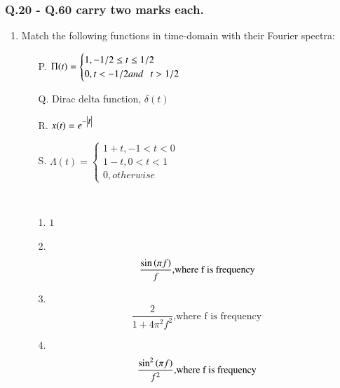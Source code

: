 \documentclass[12pt,fleqn]{article}
\theoremstyle{remark}
\begin{document}
\subsubsection*{Q.20 - Q.60 carry two marks each.}
\begin{enumerate}[label=Q.\arabic*.,font=\bfseries, start = 21]
\item Match the following functions in time-domain with their Fourier spectra: \hfill{} 
\begin{multicols}{2}
    \begin{itemize}
    \item [P.]  $\Pi{(t)} =
        \begin{cases}
        1,-1/2\leq t \leq 1/2\\
        0,t<-1/2and\hspace{.25cm}t>1/2
        \end{cases}  $    
    \item [Q.] Dirac delta function, $\delta(t)$
    \item [R.] $x(t) = e^{-\begin{vmatrix}t\end{vmatrix}}$
    \item [S.] $\Lambda{(t)} =
        \begin{cases}
        1+t,-1<t<0\\
        1-t,0<t<1\\
        0,otherwise
    \end{cases}  $
\end{itemize}
            

            \columnbreak
            
            \\ \begin{itemize}           
            \item [1.] $1$ 
            \item [2.] \[ \frac{\sin{\ensuremath{\left(\pi f\right)}}}{f} \text{,where f is frequency }\]
            \item [3.] $$ \frac{2}{1+4\pi^2f^2}\text{,where f is frequency }$$
            \item [4.] $$ \frac{\sin^2\left(\pi f\right)}{f^2}\text{,where f is frequency }$$
            \end{itemize}
           

\end{multicols}
\end{enumerate}
\end{document}
